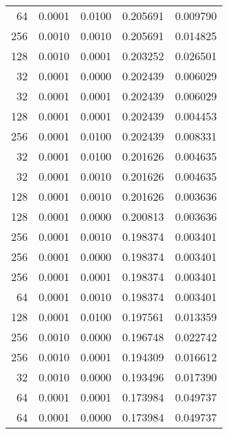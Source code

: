 \begin{tabular}{rrrrr}
  64 &  0.0001 &  0.0100 &  0.205691 &  0.009790 \\
 256 &  0.0010 &  0.0010 &  0.205691 &  0.014825 \\
 128 &  0.0010 &  0.0001 &  0.203252 &  0.026501 \\
  32 &  0.0001 &  0.0000 &  0.202439 &  0.006029 \\
  32 &  0.0001 &  0.0001 &  0.202439 &  0.006029 \\
 128 &  0.0001 &  0.0001 &  0.202439 &  0.004453 \\
 256 &  0.0001 &  0.0100 &  0.202439 &  0.008331 \\
  32 &  0.0001 &  0.0100 &  0.201626 &  0.004635 \\
  32 &  0.0001 &  0.0010 &  0.201626 &  0.004635 \\
 128 &  0.0001 &  0.0010 &  0.201626 &  0.003636 \\
 128 &  0.0001 &  0.0000 &  0.200813 &  0.003636 \\
 256 &  0.0001 &  0.0010 &  0.198374 &  0.003401 \\
 256 &  0.0001 &  0.0000 &  0.198374 &  0.003401 \\
 256 &  0.0001 &  0.0001 &  0.198374 &  0.003401 \\
  64 &  0.0001 &  0.0010 &  0.198374 &  0.003401 \\
 128 &  0.0001 &  0.0100 &  0.197561 &  0.013359 \\
 256 &  0.0010 &  0.0000 &  0.196748 &  0.022742 \\
 256 &  0.0010 &  0.0001 &  0.194309 &  0.016612 \\
  32 &  0.0010 &  0.0000 &  0.193496 &  0.017390 \\
  64 &  0.0001 &  0.0001 &  0.173984 &  0.049737 \\
  64 &  0.0001 &  0.0000 &  0.173984 &  0.049737 \\
\bottomrule
\end{tabular}
